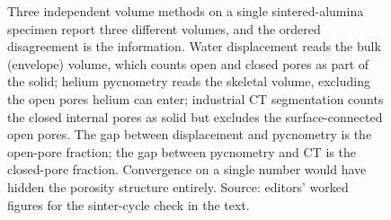 \begin{figure}[ht]
\begin{tikzpicture}[x=1cm, y=1cm, font=\small]
\end{tikzpicture}
\caption[Three volume methods discriminate porosity structure]{Three
independent volume methods on a single sintered-alumina specimen
report three different volumes, and the ordered disagreement is the
information. Water displacement reads the bulk (envelope) volume,
which counts open and closed pores as part of the solid; helium
pycnometry reads the skeletal volume, excluding the open pores helium
can enter; industrial CT segmentation counts the closed internal
pores as solid but excludes the surface-connected open pores. The gap
between displacement and pycnometry is the open-pore fraction; the gap
between pycnometry and CT is the closed-pore fraction. Convergence on
a single number would have hidden the porosity structure entirely.
Source: editors' worked figures for the sinter-cycle check in the
text.}
\label{fig:vol01:ch07:porosity-volume-methods}
\end{figure}
